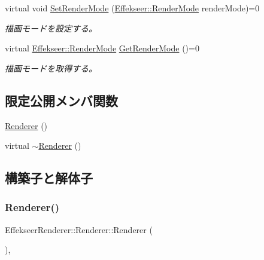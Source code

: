 \begin{DoxyCompactItemize}
virtual void \mbox{\hyperlink{class_effekseer_renderer_1_1_renderer_ab0805785cad223b4a79d2d16fcd9bec8}{Set\+Render\+Mode}} (\mbox{\hyperlink{namespace_effekseer_ad1b82893021dd8e3697e46c1aa544092}{Effekseer\+::\+Render\+Mode}} render\+Mode)=0
\begin{DoxyCompactList}\small\item\em 描画モードを設定する。 \end{DoxyCompactList}\item 
virtual \mbox{\hyperlink{namespace_effekseer_ad1b82893021dd8e3697e46c1aa544092}{Effekseer\+::\+Render\+Mode}} \mbox{\hyperlink{class_effekseer_renderer_1_1_renderer_a45fd7eb7a8796aeb67467511891a48fd}{Get\+Render\+Mode}} ()=0
\begin{DoxyCompactList}\small\item\em 描画モードを取得する。 \end{DoxyCompactList}\end{DoxyCompactItemize}
\subsection*{限定公開メンバ関数}
\begin{DoxyCompactItemize}
\item 
\mbox{\hyperlink{class_effekseer_renderer_1_1_renderer_ac28b8a076c8ae3ee80e47cfa41a5b725}{Renderer}} ()
\item 
virtual \mbox{\hyperlink{class_effekseer_renderer_1_1_renderer_ad85143b942b06b4fa4741713f7bcd84b}{$\sim$\+Renderer}} ()
\end{DoxyCompactItemize}


\subsection{構築子と解体子}
\mbox{\label{class_effekseer_renderer_1_1_renderer_ac28b8a076c8ae3ee80e47cfa41a5b725}} 
\subsubsection{\texorpdfstring{Renderer()}{Renderer()}}
{\footnotesize\ttfamily Effekseer\+Renderer\+::\+Renderer\+::\+Renderer (\begin{DoxyParamCaption}{ }\end{DoxyParamCaption})\hspace{0.3cm}{\ttfamily [inline]}, {\ttfamily [protected]}}

